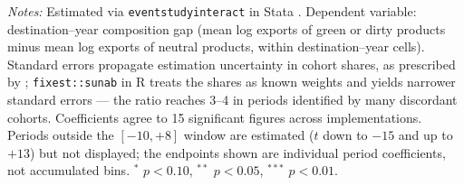 \begin{table}[htbp]
\begin{threeparttable}
\begin{tablenotes}[flushleft]
\item \emph{Notes:} Estimated via \texttt{eventstudyinteract} in Stata \citep{sun2021}. Dependent variable: destination--year composition gap (mean log exports of green or dirty products minus mean log exports of neutral products, within destination--year cells). Standard errors propagate estimation uncertainty in cohort shares, as prescribed by \citet{sun2021}; \texttt{fixest::sunab} in R treats the shares as known weights and yields narrower standard errors --- the ratio reaches 3--4 in periods identified by many discordant cohorts. Coefficients agree to 15 significant figures across implementations. Periods outside the $[-10,+8]$ window are estimated ($t$ down to $-15$ and up to $+13$) but not displayed; the endpoints shown are individual period coefficients, not accumulated bins. $^{*}$ $p<0.10$, $^{**}$ $p<0.05$, $^{***}$ $p<0.01$.
\end{tablenotes}
\end{threeparttable}
\end{table}
